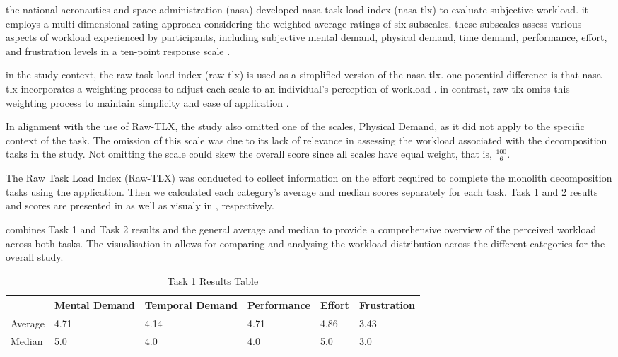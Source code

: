 the national aeronautics and space administration (nasa) developed nasa task
load index (nasa-tlx) to evaluate subjective workload. it employs a
multi-dimensional rating approach considering the weighted average ratings of
six subscales. these subscales assess various aspects of workload experienced
by participants, including subjective mental demand, physical demand, time
demand, performance, effort, and frustration levels in a ten-point response
scale \cite{hart1988development}.

in the study context, the raw task load index (raw-tlx) is used as a simplified
version of the nasa-tlx. one potential difference is that nasa-tlx incorporates
a weighting process to adjust each scale to an individual's perception of
workload \cite{hart1988development}. in contrast, raw-tlx omits this weighting
process to maintain simplicity and ease of application \cite{hart2006nasa}.

In alignment with the use of Raw-TLX, the study also omitted one of the scales,
Physical Demand, as it did not apply to the specific context of the task. The
omission of this scale was due to its lack of relevance in assessing the
workload associated with the decomposition tasks in the study. Not omitting the
scale could skew the overall score since all scales have equal weight, that is,
\( \frac{100}{6} \).

The Raw Task Load Index (Raw-TLX) was conducted to collect information on the
effort required to complete the monolith decomposition tasks using the
application. Then we calculated each category's average and median scores
separately for each task. Task 1 and 2 results and scores are presented in
 as well as visualy in
, respectively.

 combines Task 1 and Task 2 results and the general
average and median to provide a comprehensive overview of the perceived
workload across both tasks. The visualisation in 
allows for comparing and analysing the workload distribution across the
different categories for the overall study.

\begin{table}[!htb] \caption{Task 1 Results Table} \label{tab:separated_task_1}
  \begin{center}
    \begin{tabular}[c]{p{4em}|p{4em}|p{4em}|p{4em}|p{4em}|p{4em}}
      \textbf{} &
      \textbf{Mental Demand} &
      \textbf{Temporal Demand} &
      \textbf{Perfor\-mance} &
      \textbf{Effort} &
      \textbf{Frustration} \\
      \hline Average & 4.71 & 4.14 & 4.71 & 4.86 & 3.43 \\
      \hline Median & 5.0 & 4.0 & 4.0 & 5.0 & 3.0 \\
    \end{tabular}
  \end{center}
\end{table}

